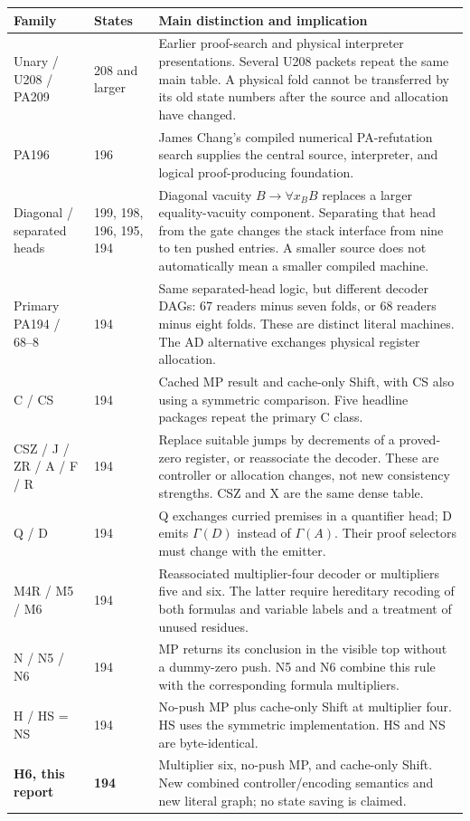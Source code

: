 \documentclass[11pt,letterpaper]{article}
\begin{document}
\begin{longtable}{p{}p{}p{}}
\toprule Family & States & Main distinction and implication\\\midrule\endhead
Unary / U208 / PA209 & 208 and larger & Earlier proof-search and physical
interpreter presentations. Several U208 packets repeat the same main table.
A physical fold cannot be transferred by its old state numbers after the
source and allocation have changed.\\
PA196 & 196 & James Chang's compiled numerical PA-refutation search supplies
the central source, interpreter, and logical proof-producing foundation.\\
Diagonal / separated heads & 199, 198, 196, 195, 194 & Diagonal vacuity
\(B\to\forall x_B B\) replaces a larger equality-vacuity component.
Separating that head from the gate changes the stack interface from nine
to ten pushed entries. A smaller source does not automatically mean a
smaller compiled machine.\\
Primary PA194 / 68--8 & 194 & Same separated-head logic, but different decoder
DAGs: 67 readers minus seven folds, or 68 readers minus eight folds. These
are distinct literal machines. The AD alternative exchanges physical
register allocation.\\
C / CS & 194 & Cached MP result and cache-only Shift, with CS also using a
symmetric comparison. Five headline packages repeat the primary C class.\\
CSZ / J / ZR / A / F / R & 194 & Replace suitable jumps by decrements of a
proved-zero register, or reassociate the decoder. These are controller or
allocation changes, not new consistency strengths. CSZ and X are the same
dense table.\\
Q / D & 194 & Q exchanges curried premises in a quantifier head; D emits
\(\Gamma(D)\) instead of \(\Gamma(A)\). Their proof selectors must change
with the emitter.\\
M4R / M5 / M6 & 194 & Reassociated multiplier-four decoder or multipliers
five and six. The latter require hereditary recoding of both formulas and
variable labels and a treatment of unused residues.\\
N / N5 / N6 & 194 & MP returns its conclusion in the visible top without a
dummy-zero push. N5 and N6 combine this rule with the corresponding
formula multipliers.\\
H / HS = NS & 194 & No-push MP plus cache-only Shift at multiplier four.
HS uses the symmetric implementation. HS and NS are byte-identical.\\
\textbf{H6, this report} & \textbf{194} & Multiplier six, no-push MP, and
cache-only Shift. New combined controller/encoding semantics and new
literal graph; no state saving is claimed.\\
\bottomrule
\end{longtable}
\end{document}
